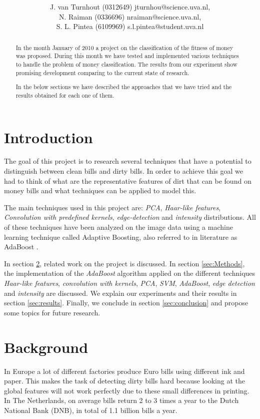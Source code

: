 \documentclass[11pt,twocolumn]{article}
\title{\tbf{Dirty Money:}\\\tbf{Feature selection using AdaBoost}}
\author{J. van Turnhout (0312649) jturnhou@science.uva.nl, 
	 \\ N. Raiman (0336696) nraiman@science.uva.nl, 
	 \\ S. L. Pintea (6109969) s.l.pintea@student.uva.nl}
\begin{document}
	\maketitle
	
	\begin{abstract}
		In the month January of 2010 a project on the classification of
		the fitness of money was proposed. During this month we have tested and
		implemented various techniques to handle the problem of money classification.
		The results from our experiment show promising development comparing to the
		current state of research.
		
		In the below sections we have described the approaches that we
		have tried and the results obtained for each one of them.
	\end{abstract}
	
	\section{Introduction}
		The goal of this project is to research several techniques that have a potential to distinguish between clean bills and dirty bills. In order to achieve this goal we had to think of what are the representative features of dirt that can be found on money bills and what techniques can be applied to model this.
		 		
		The main techniques used in this project are: \emph{PCA}, \emph{Haar-like features}, \emph{Convolution with predefined kernels}, \emph{edge-detection} and \emph{intensity} distributions. All of these techniques have been analyzed on the image data using a machine learning technique called Adaptive Boosting, also referred to in literature as AdaBoost \cite{Ada}.
		
		In section \ref{sec:Background}, related work on the project is discussed. In section \ref{sec:Methods}, the implementation of the \emph{AdaBoost} algorithm applied on the different techniques \emph{Haar-like features}, \emph{convolution with kernels}, \emph{PCA}, \emph{SVM}, \emph{AdaBoost}, \emph{edge detection} and \emph{intensity} are discussed. We explain our experiments and their results in section \ref{sec:results}. Finally, we conclude in section \ref{sec:conclusion} and propose some topics for future research.
	\section{Background}\label{sec:Background}
		In Europe a lot of different factories produce Euro bills using different ink and paper. This makes the task of detecting dirty bills hard because looking at the global features will not work perfectly due to these small differences in printing. In The Netherlands, on average bills return 2 to 3 times a year to the Dutch National Bank (DNB), in total of 1.1 billion bills a year. 
\end{document}

